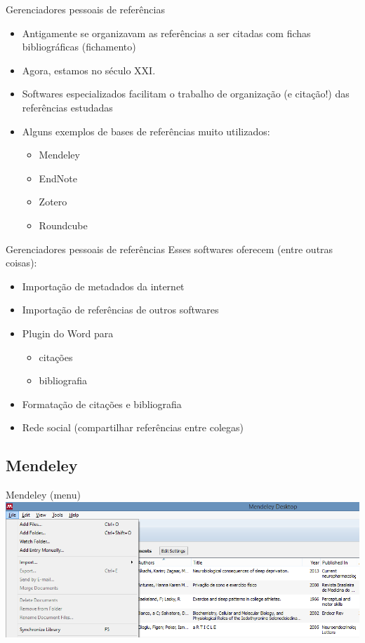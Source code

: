 \documentclass{beamer}
\begin{document}
\begin{frame}{Gerenciadores pessoais de referências}
  \begin{itemize}
  \item Antigamente se organizavam as referências a ser citadas com
    fichas bibliográficas (fichamento)
  \item Agora, estamos no século XXI.
  \item Softwares especializados facilitam o trabalho de organização
    (e citação!) das referências estudadas
  \item Alguns exemplos de bases de referências muito utilizados:
    \begin{itemize}
    \item<4-> \alert<5->{Mendeley}
    \item<4-> EndNote
    \item<4-> Zotero
    \item<4-> Roundcube
    \end{itemize}
  \end{itemize}
\end{frame}

\begin{frame}{Gerenciadores pessoais de referências}
  Esses softwares oferecem (entre outras coisas):
  \begin{itemize}
  \item Importação de metadados da internet
  \item Importação de referências de outros softwares
  \item Plugin do Word para
    \begin{itemize}
    \item<3-> citações
    \item<3-> bibliografia
    \end{itemize}
  \item Formatação de citações e bibliografia
  \item Rede social (compartilhar referências entre colegas)
  \end{itemize}
\end{frame}

\subsection{Mendeley}

\begin{frame}{Mendeley (menu)}
  \includegraphics[width=1.2\textwidth]{Referencias/mendeley-menu}
\end{frame}
\end{document}
